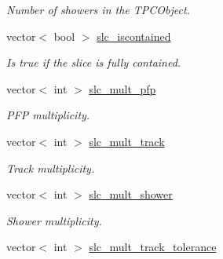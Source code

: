 \begin{DoxyCompactItemize}
\begin{DoxyCompactList}\small\item\em Number of showers in the T\-P\-C\-Object. \end{DoxyCompactList}\item 
\hypertarget{classUBXSecEvent_aed6d8542df31ecee430516b2db5807a5}{vector$<$ bool $>$ \hyperlink{classUBXSecEvent_aed6d8542df31ecee430516b2db5807a5}{slc\-\_\-iscontained}}\label{classUBXSecEvent_aed6d8542df31ecee430516b2db5807a5}

\begin{DoxyCompactList}\small\item\em Is true if the slice is fully contained. \end{DoxyCompactList}\item 
\hypertarget{classUBXSecEvent_afb9baad67b754eceb3d2b472f9bd969f}{vector$<$ int $>$ \hyperlink{classUBXSecEvent_afb9baad67b754eceb3d2b472f9bd969f}{slc\-\_\-mult\-\_\-pfp}}\label{classUBXSecEvent_afb9baad67b754eceb3d2b472f9bd969f}

\begin{DoxyCompactList}\small\item\em P\-F\-P multiplicity. \end{DoxyCompactList}\item 
\hypertarget{classUBXSecEvent_a2fe1b939fcaf6ffbeb68c8879239c2c0}{vector$<$ int $>$ \hyperlink{classUBXSecEvent_a2fe1b939fcaf6ffbeb68c8879239c2c0}{slc\-\_\-mult\-\_\-track}}\label{classUBXSecEvent_a2fe1b939fcaf6ffbeb68c8879239c2c0}

\begin{DoxyCompactList}\small\item\em Track multiplicity. \end{DoxyCompactList}\item 
\hypertarget{classUBXSecEvent_aaf02413b3f000c45ecaf8aafa9d4e9be}{vector$<$ int $>$ \hyperlink{classUBXSecEvent_aaf02413b3f000c45ecaf8aafa9d4e9be}{slc\-\_\-mult\-\_\-shower}}\label{classUBXSecEvent_aaf02413b3f000c45ecaf8aafa9d4e9be}

\begin{DoxyCompactList}\small\item\em Shower multiplicity. \end{DoxyCompactList}\item 
\hypertarget{classUBXSecEvent_ab49b7199fe07b6ed85017048b685d7bb}{vector$<$ int $>$ \hyperlink{classUBXSecEvent_ab49b7199fe07b6ed85017048b685d7bb}{slc\-\_\-mult\-\_\-track\-\_\-tolerance}}\label{classUBXSecEvent_ab49b7199fe07b6ed85017048b685d7bb}


\end{DoxyCompactItemize}
